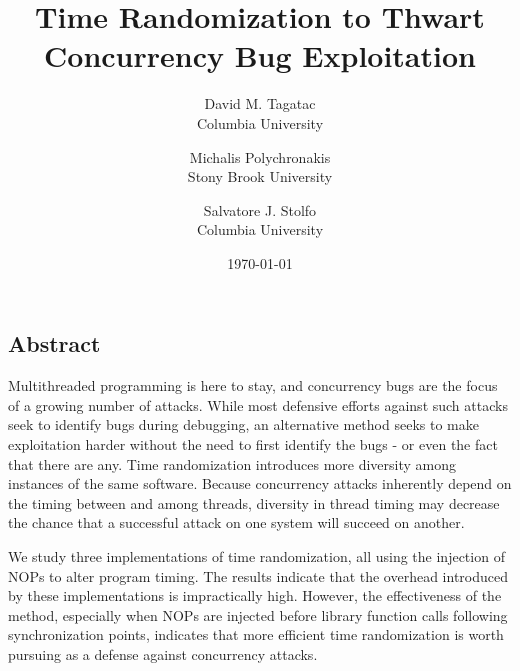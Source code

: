 \documentclass[letterpaper,twocolumn,10pt]{article}
\begin{document}
\date{\today}

\title{\Large \bf Time Randomization to Thwart Concurrency Bug Exploitation}

\author{
{\rm David M. Tagatac}\\
Columbia University
\and
{\rm Michalis Polychronakis}\\
Stony Brook University
\and
{\rm Salvatore J. Stolfo}\\
Columbia University
} %

\maketitle

\subsection*{Abstract}
Multithreaded programming is here to stay, and concurrency bugs are the focus of a growing number of attacks.
While most defensive efforts against such attacks seek to identify bugs during debugging, an alternative method seeks to make exploitation harder without the need to first identify the bugs - or even the fact that there are any.
Time randomization introduces more diversity among instances of the same software.
Because concurrency attacks inherently depend on the timing between and among threads, diversity in thread timing may decrease the chance that a successful attack on one system will succeed on another.

We study three implementations of time randomization, all using the injection of NOPs to alter program timing.  The results indicate that the overhead introduced by these implementations is impractically high.  However, the effectiveness of the method, especially when NOPs are injected before library function calls following synchronization points, indicates that more efficient time randomization is worth pursuing as a defense against concurrency attacks.
\end{document}
